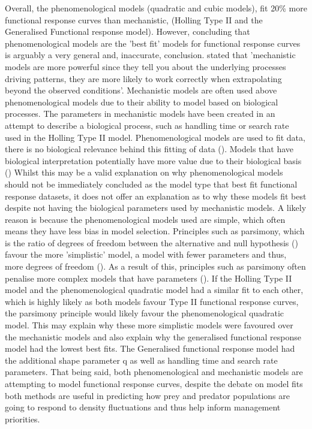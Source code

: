 \documentclass[11pt]{article}
\begin{document}
Overall, the phenomenological models (quadratic and cubic models), fit 20\% more functional response curves than mechanistic, (Holling Type II and the Generalised Functional response model). However, concluding that phenomenological models are the 'best fit' models for functional response curves is arguably a very general and, inaccurate, conclusion. \cite{Bolker2008} stated that 'mechanistic models are more powerful since they tell you about the underlying processes driving patterns, they are more likely to work correctly when extrapolating beyond the observed conditions'. Mechanistic models are often used above phenomenological models due to their ability to model based on biological processes. The parameters in mechanistic models have been created in an attempt to describe a biological process, such as handling time or search rate used in the Holling Type II model. Phenomenological models are used to fit data, there is no biological relevance behind this fitting of data (\cite{Hilborn1997}). Models that have biological interpretation potentially have more value due to their biological basis (\cite{Johnson2004})  \newline
Whilst this may be a valid explanation on why phenomenological models should not be immediately concluded as the model type that best fit functional response datasets, it does not offer an explanation as to why these models fit best despite not having the biological parameters used by mechanistic models. A likely reason is because the phenomenological models used are simple, which often means they have less bias in model selection. Principles such as parsimony, which is the ratio of degrees of freedom between the alternative and null hypothesis (\cite{Marsh1998}) favour the more 'simplistic' model, a model with fewer parameters and thus, more degrees of freedom (\cite{Mulaik1998}). As a result of this, principles such as parsimony often penalise more complex models that have parameters (\cite{Raykov1999}). If the Holling Type II model and the phenomenological quadratic model had a similar fit to each other, which is highly likely as both models favour Type II functional response curves, the parsimony principle would likely favour the phenomenological quadratic model. This may explain why these more simplistic models were favoured over the mechanistic models and also explain why the generalised functional response model had the lowest best fits. The Generalised functional response model had the additional shape parameter q as well as handling time and search rate parameters. That being said, both phenomenological and mechanistic models are attempting to model functional response curves, despite the debate on model fits both methods are useful in predicting how prey and predator populations are going to respond to density fluctuations and thus help inform management priorities. 
\end{document}
